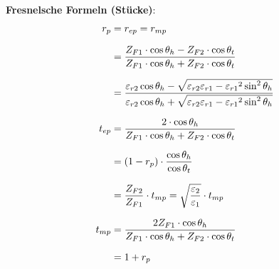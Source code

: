 \textbf{Fresnelsche Formeln (Stücke)}:
\begin{equation*}
		\setlength{\jot}{10pt}
	\begin{aligned}
		r_p    & =  r_{ep} = r_{mp}                                                                                                                                                                                                     \\
		& = \frac{Z_{F1} \cdot \cos \theta_h-Z_{F2} \cdot \cos \theta_t}{Z_{F1} \cdot \cos \theta_h+Z_{F2} \cdot \cos \theta_t}                                                                                      \\
		& = \frac{\varepsilon_{r2}\cos\theta_h-\sqrt{\varepsilon_{r2}\varepsilon_{r1}-{\varepsilon_{r1}}^2\sin^2\theta_h}}{\varepsilon_{r2}\cos\theta_h+\sqrt{{\varepsilon_{r2}\varepsilon_{r1}-{\varepsilon_{r1}}^2\sin^2\theta_h}}} \\
		t_{ep} & =  \frac{2  \cdot \cos \theta_h}{Z_{F1} \cdot \cos \theta_h+Z_{F2} \cdot \cos \theta_t}                                                                                                                          \\
		& = (1-r_p) \cdot \dfrac{\cos \theta_h}{\cos \theta_t}                                                                                                                                                                        \\
		& = \frac{Z_{F2}}{Z_{F1}}\cdot t_{mp} = \sqrt{\frac{\varepsilon_2}{\varepsilon_1}}\cdot t_{mp} \\
		t_{mp} & = \frac{2 Z_{F1}\cdot \cos \theta_h}{Z_{F1} \cdot \cos \theta_h+Z_{F2} \cdot \cos \theta_t}                                                                                                                          \\
		& = 1+r_p                                                                                                                                                                                                                
	\end{aligned}
\end{equation*}
